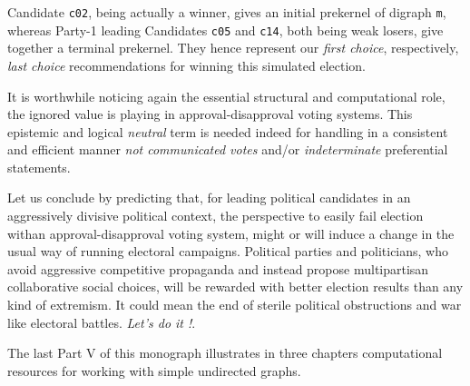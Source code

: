 Candidate \texttt{c02}, being actually a \Condorcet winner, gives an initial prekernel of digraph \texttt{m}, whereas Party-1 leading Candidates \texttt{c05} and \texttt{c14}, both being weak \Condorcet losers, give together a terminal prekernel. They hence represent our \emph{first choice}, respectively, \emph{last choice} recommendations for winning this simulated election.

It is worthwhile noticing again the essential structural and computational role, the ignored value is playing in approval-disapproval voting systems. This epistemic and logical \emph{neutral} term is needed indeed for handling in a consistent and efficient manner \emph{not communicated votes} and/or \emph{indeterminate} preferential statements.

Let us conclude by predicting that, for leading political candidates in an aggressively divisive political context, the perspective to easily fail election withan approval-disapproval voting system, might or will induce a change in the usual way of running electoral campaigns. Political parties and politicians, who avoid aggressive competitive propaganda and instead propose multipartisan collaborative social choices, will be rewarded with better election results than any kind of extremism. It could mean the end of sterile political obstructions and war like electoral battles. \emph{Let's do it !}.

\vspace{\baselineskip}
The last Part V of this monograph illustrates in three chapters computational resources for working with simple undirected graphs.


%
%
